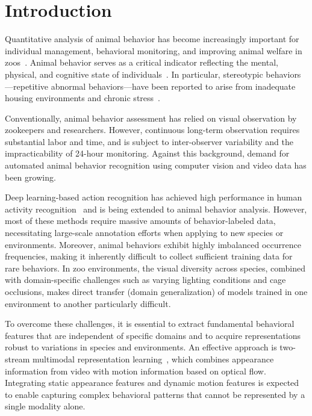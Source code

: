 \documentclass[twocolumn]{svjour3}
\begin{document}
\section{Introduction}
\label{sec:intro}

Quantitative analysis of animal behavior has become increasingly important for individual management, behavioral monitoring, and improving animal welfare in zoos~\cite{mellor2017updating}.
Animal behavior serves as a critical indicator reflecting the mental, physical, and cognitive state of individuals~\cite{broom1986indicators}.
In particular, stereotypic behaviors---repetitive abnormal behaviors---have been reported to arise from inadequate housing environments and chronic stress~\cite{mason1991stereotypies}.

Conventionally, animal behavior assessment has relied on visual observation by zookeepers and researchers.
However, continuous long-term observation requires substantial labor and time, and is subject to inter-observer variability and the impracticability of 24-hour monitoring.
Against this background, demand for automated animal behavior recognition using computer vision and video data has been growing.

Deep learning-based action recognition has achieved high performance in human activity recognition~\cite{carreira2017quo} and is being extended to animal behavior analysis.
However, most of these methods require massive amounts of behavior-labeled data, necessitating large-scale annotation efforts when applying to new species or environments.
Moreover, animal behaviors exhibit highly imbalanced occurrence frequencies, making it inherently difficult to collect sufficient training data for rare behaviors.
In zoo environments, the visual diversity across species, combined with domain-specific challenges such as varying lighting conditions and cage occlusions, makes direct transfer (domain generalization) of models trained in one environment to another particularly difficult.

To overcome these challenges, it is essential to extract fundamental behavioral features that are independent of specific domains and to acquire representations robust to variations in species and environments.
An effective approach is two-stream multimodal representation learning~\cite{simonyan2014two}, which combines appearance information from video with motion information based on optical flow.
Integrating static appearance features and dynamic motion features is expected to enable capturing complex behavioral patterns that cannot be represented by a single modality alone.
\end{document}
